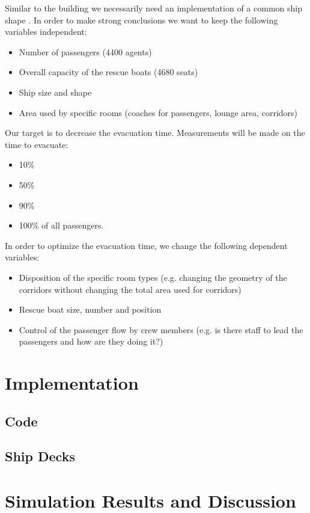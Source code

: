 \documentclass[11pt]{article}
\begin{document}
Similar to the building we necessarily need an  implementation of a common ship shape \cite{shipdecks}. In order to make strong conclusions we want to keep the following variables independent:
\begin{itemize}
\item Number of passengers (4400 agents)
\item Overall capacity of the rescue boats (4680 seats)
\item Ship size and shape
\item Area used by specific rooms (coaches for passengers, lounge area, corridors)
\end{itemize}
Our target is to decrease the evacuation time. Measurements will be made on the time to evacuate:
\begin{itemize}
\item 10\%
\item 50\%
\item 90\%
\item100\% of all passengers.
\end{itemize}
In order to optimize the evacuation time, we change the following dependent variables:
\begin{itemize}
\item Disposition of the specific room types (e.g. changing the geometry of the corridors without changing the total area used for corridors)
\item Rescue boat size, number and position
\item Control of the passenger flow by crew members (e.g. is there staff to lead the passengers and how are they doing it?)
\end{itemize}




\section{Implementation}
\subsection{Code}
\subsection{Ship Decks}
\section{Simulation Results and Discussion}
\end{document}
